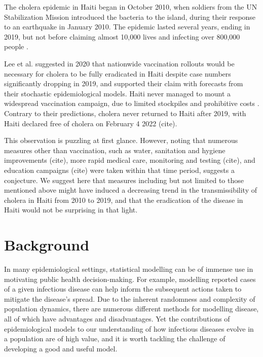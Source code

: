 \documentclass[12pt]{article}
\begin{document}
  The cholera epidemic in Haiti began in October 2010, when soldiers from the UN Stabilization Mission introduced the bacteria to the island, during their response to an earthquake in January 2010. 
  The epidemic lasted several years, ending in 2019, but not before claiming almost 10,000 lives and infecting over 800,000 people \cite{Lee_haiticholera}. 
  
  Lee et al. \cite{Lee_haiticholera} suggested in 2020 that nationwide vaccination rollouts would be necessary for cholera to be fully eradicated in Haiti despite case numbers significantly dropping in 2019, and supported their claim with forecasts from their stochastic epidemiological models.
  Haiti never managed to mount a widespread vaccination campaign, due to limited stockpiles and prohibitive costs \cite{rebaudet}. 
  Contrary to their predictions, cholera never returned to Haiti after 2019, with Haiti declared free of cholera on February 4 2022 (cite). 
  
  This observation is puzzling at first glance. 
  However, noting that numerous measures other than vaccination, such as water, sanitation and hygiene improvements (cite), more rapid medical care, monitoring and testing (cite), and education campaigns (cite) were taken within that time period, suggests a conjecture. 
  We suggest here that measures including but not limited to those mentioned above might have induced a decreasing trend in the transmissibility of cholera in Haiti from 2010 to 2019, and that the eradication of the disease in Haiti would not be surprising in that light.


\section{Background}


 In many epidemiological settings, statistical modelling can be of immense use in motivating public health decision-making. For example, modelling reported cases of a given infectious disease can help inform the subsequent actions taken to mitigate the disease's spread. Due to the inherent randomness and complexity of population dynamics, there are numerous different methods for modelling disease, all of which have advantages and disadvantages. Yet the contributions of epidemiological models to our understanding of how infectious diseases evolve in a population are of high value, and it is worth tackling the challenge of developing a good and useful model.
  
\end{document}
